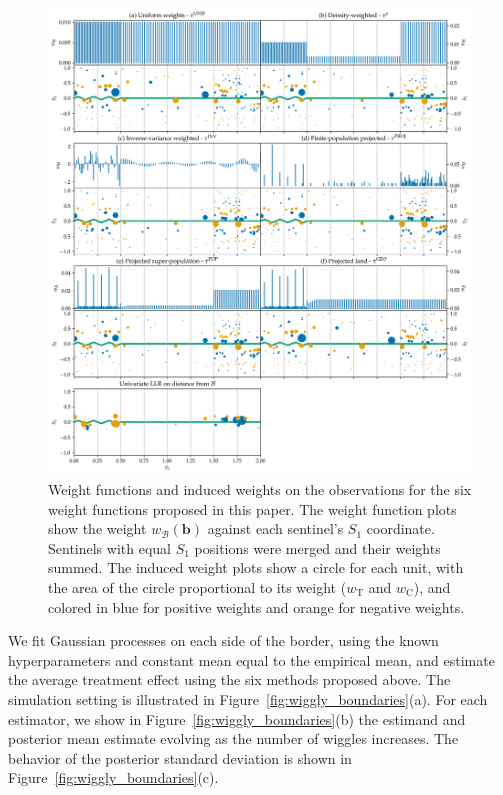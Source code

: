 \documentclass[letter]{article}
\makeatletter
\def\maxwidth{\ifdim\Gin@nat@width>\linewidth\linewidth
\else\Gin@nat@width\fi}
\let\Oldincludegraphics\includegraphics
\renewcommand{\includegraphics}[1]{\Oldincludegraphics[width=1.0\maxwidth]{#1}}
\newcommand{\treat}{\mathrm{T}}
\newcommand{\ctrol}{\mathrm{C}}
\newcommand{\border}{\mathcal{B}}
\newcommand{\sentinels}{\bm{b}}
\newcommand{\weightb}{w_{\border}}
\newcommand{\wt}{w_{\treat}}
\newcommand{\wc}{w_{\ctrol}}
\makeatother
\begin{document}
    	\begin{figure}
\centering
\includegraphics{../figures/weight_functions.png}
\caption{\label{fig:weight_functions}Weight functions and induced weights on the observations for the six weight functions proposed in this paper. The weight function plots show the weight \(\weightb(\sentinels)\) against each sentinel's \(S_1\) coordinate. Sentinels with equal \(S_1\) positions were merged and their weights summed. The induced weight plots show a circle for each unit, with the area of the circle proportional to its weight (\(\wt\) and \(\wc\)), and colored in blue for positive weights and orange for negative weights.}
\end{figure}
    


    	We fit Gaussian processes on each side of the border,
using the known hyperparameters and constant mean equal to the empirical mean,
and estimate the average treatment effect using the six methods proposed above.
The simulation setting is illustrated in Figure~\ref{fig:wiggly_boundaries}(a).
For each estimator, we show in Figure~\ref{fig:wiggly_boundaries}(b) the estimand and posterior mean estimate evolving as the number of wiggles increases.
The behavior of the posterior standard deviation is shown in Figure~\ref{fig:wiggly_boundaries}(c).
\end{document}
